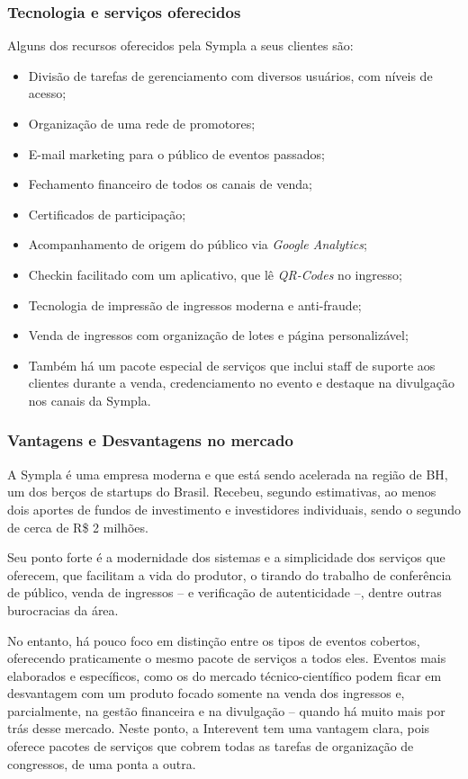 \documentclass[12pt,a4paper,twoside,hyphens,english,brazil]{abntex2}
\begin{document}
\subsubsection*{Tecnologia e serviços oferecidos}
Alguns dos recursos oferecidos pela Sympla a seus clientes são\cite{sympla-features}:
\begin{itemize}[itemsep=-1ex]
	\item Divisão de tarefas de gerenciamento com diversos usuários, com níveis de acesso;
	\item Organização de uma rede de promotores;
	\item E-mail marketing para o público de eventos passados;
	\item Fechamento financeiro de todos os canais de venda;
	\item Certificados de participação;
	\item Acompanhamento de origem do público via \emph{Google Analytics};
	\item Checkin facilitado com um aplicativo, que lê \emph{QR-Codes} no ingresso;
	\item Tecnologia de impressão de ingressos moderna e anti-fraude;
	\item Venda de ingressos com organização de lotes e página personalizável;
	\item Também há um pacote especial de serviços que inclui staff de suporte aos clientes durante a venda, credenciamento no evento e destaque na divulgação nos canais da Sympla.
\end{itemize}

\subsubsection*{Vantagens e Desvantagens no mercado}
A Sympla é uma empresa moderna e que está sendo acelerada na região de BH, um dos berços de startups do Brasil. Recebeu, segundo estimativas, ao menos dois aportes de fundos de investimento e investidores individuais, sendo o segundo de cerca de R\$ 2 milhões.\cite{sympla-aporte}

Seu ponto forte é a modernidade dos sistemas e a simplicidade dos serviços que oferecem, que facilitam a vida do produtor, o tirando do trabalho de conferência de público, venda de ingressos -- e verificação de autenticidade --, dentre outras burocracias da área.

No entanto, há pouco foco em distinção entre os tipos de eventos cobertos, oferecendo praticamente o mesmo pacote de serviços a todos eles. Eventos mais elaborados e específicos, como os do mercado técnico-científico podem ficar em desvantagem com um produto focado somente na venda dos ingressos e, parcialmente, na gestão financeira e na divulgação -- quando há muito mais por trás desse mercado. Neste ponto, a Interevent tem uma vantagem clara, pois oferece pacotes de serviços que cobrem todas as tarefas de organização de congressos, de uma ponta a outra.
\end{document}

